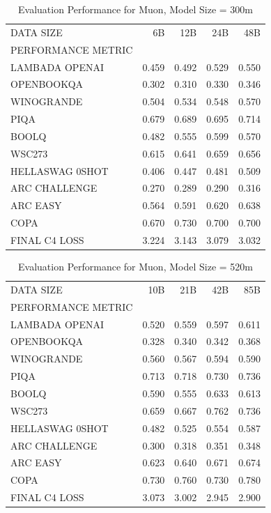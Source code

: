 \begin{table}
[H] \centering \caption{Evaluation Performance for Muon, Model Size = 300m}
\label{tab:eval-performance-muon-300M}
\begin{tabular}{lrrrr}
\toprule
DATA SIZE & 6B & 12B & 24B & 48B \\
PERFORMANCE METRIC &  &  &  &  \\
\midrule
LAMBADA OPENAI & 0.459 & 0.492 & 0.529 & 0.550 \\
OPENBOOKQA & 0.302 & 0.310 & 0.330 & 0.346 \\
WINOGRANDE & 0.504 & 0.534 & 0.548 & 0.570 \\
PIQA & 0.679 & 0.689 & 0.695 & 0.714 \\
BOOLQ & 0.482 & 0.555 & 0.599 & 0.570 \\
WSC273 & 0.615 & 0.641 & 0.659 & 0.656 \\
HELLASWAG 0SHOT & 0.406 & 0.447 & 0.481 & 0.509 \\
ARC CHALLENGE & 0.270 & 0.289 & 0.290 & 0.316 \\
ARC EASY & 0.564 & 0.591 & 0.620 & 0.638 \\
COPA & 0.670 & 0.730 & 0.700 & 0.700 \\
FINAL C4 LOSS & 3.224 & 3.143 & 3.079 & 3.032 \\
\bottomrule
\end{tabular}
\end{table}


\begin{table}
[H] \centering \caption{Evaluation Performance for Muon, Model Size = 520m}
\label{tab:eval-performance-muon-520M}
\begin{tabular}{lrrrr}
\toprule
DATA SIZE & 10B & 21B & 42B & 85B \\
PERFORMANCE METRIC &  &  &  &  \\
\midrule
LAMBADA OPENAI & 0.520 & 0.559 & 0.597 & 0.611 \\
OPENBOOKQA & 0.328 & 0.340 & 0.342 & 0.368 \\
WINOGRANDE & 0.560 & 0.567 & 0.594 & 0.590 \\
PIQA & 0.713 & 0.718 & 0.730 & 0.736 \\
BOOLQ & 0.590 & 0.555 & 0.633 & 0.613 \\
WSC273 & 0.659 & 0.667 & 0.762 & 0.736 \\
HELLASWAG 0SHOT & 0.482 & 0.525 & 0.554 & 0.587 \\
ARC CHALLENGE & 0.300 & 0.318 & 0.351 & 0.348 \\
ARC EASY & 0.623 & 0.640 & 0.671 & 0.674 \\
COPA & 0.730 & 0.760 & 0.730 & 0.780 \\
FINAL C4 LOSS & 3.073 & 3.002 & 2.945 & 2.900 \\
\bottomrule
\end{tabular}
\end{table}


